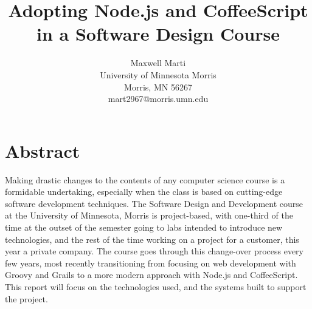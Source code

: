 \documentclass[12pt]{article}
\newcommand{\comment}[1]{{\bf \tt  {#1}}}
\begin{document}
\pagestyle{plain}
%




\title{Adopting Node.js and CoffeeScript in a Software Design Course}
%
%




\author{
Maxwell Marti \\
University of Minnesota Morris\\
Morris, MN 56267\\
mart2967@morris.umn.edu
}




\date{}




\maketitle
\thispagestyle{empty}


\section*{\centering Abstract}
Making drastic changes to the contents of any computer science course is a formidable undertaking, especially when the class is based on cutting-edge software development techniques. The Software Design and Development course at the University of Minnesota, Morris is project-based, with one-third of the time at the outset of the semester going to labs intended to introduce new technologies, and the rest of the time working on a project for a customer, this year a private company. The course goes through this change-over process every few years, most recently transitioning from focusing on web development with Groovy and Grails to a more modern approach with Node.js and CoffeeScript. This report will focus on the technologies used, and the systems built to support the project.
	
\end{document}
